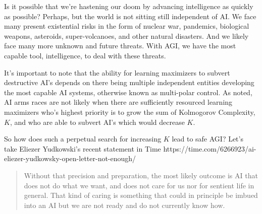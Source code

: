 \documentclass{article}
\begin{document}
Is it possible that we're hastening our doom by advancing intelligence as quickly as possible?
Perhaps, but the world is not sitting still independent of AI. We face many present existential risks in the form of nuclear war, pandemics, biological weapons, asteroids, super-volcanoes, and other natural disasters. And we likely face many more unknown and future threats. With AGI, we have the most capable tool, intelligence, to deal with these threats.

It's important to note that the ability for learning maximizers to subvert destructive AI's depends on there being multiple independent entities developing the most capable AI systems, otherwise known as multi-polar control. As noted, AI arms races are not likely when there are sufficiently resourced learning maximizers who's highest priority is to grow the sum of Kolmogorov Complexity, $K$, and who are able to subvert AI's which would decrease $K$.

So how does such a perpetual search for increasing $K$ lead to safe AGI?
Let's take Eliezer Yudkowski's recent statement in Time https://time.com/6266923/ai-eliezer-yudkowsky-open-letter-not-enough/

\begin{quotation}
Without that precision and preparation, the most likely outcome is AI that does not do what we want, and does not care for us nor for sentient life in general. That kind of caring is something that could in principle be imbued into an AI but we are not ready and do not currently know how.
\end{quotation}
\end{document}
